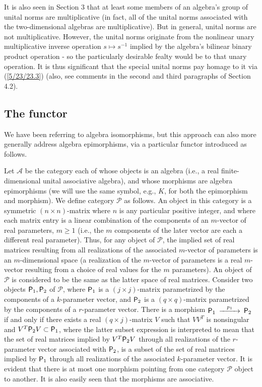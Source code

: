 \documentclass{amsart}
\numberwithin{equation}{section}
\theoremstyle{definition}
\numberwithin{theorem}{section}
\begin{document}
It is also seen in Section 3 that at least some members of an algebra's group of unital norms are multiplicative (in fact, all of the unital norms associated with the two-dimensional algebras are multiplicative).   But in general, unital norms are not multiplicative.  However, the unital norms originate from the nonlinear unary multiplicative inverse operation $s\mapsto s^{-1}$ implied by the algebra's bilinear binary product operation - so the particularly desirable fealty would be to that unary operation.  It is thus significant that the special unital norms pay homage to it via (\ref{5/23/23.3}) (also, see comments in the second and third paragraphs of Section 4.2). 

\subsection{The functor}

We have been referring to algebra isomorphisms, but this approach can also more generally address algebra epimorphisms, via a particular functor introduced as follows.  

Let $\mathcal{A}$ be the category each of whose objects is an algebra (i.e., a real finite-dimensional unital associative algebra), and whose morphisms are algebra epimorphisms (we will use the same symbol, e.g., $K$, for both the epimorphism and morphism).  We define category $\mathcal{P}$ as follows. An object in this category is a symmetric $(n\times n)$-matrix where $n$ is any particular positive integer, and where each matrix entry is a linear combination of the components of an $m$-vector of real parameters, $m\ge 1$ (i.e., the $m$ components of the later vector are each a different real parameter).  Thus, for any object of $\mathcal{P}$, the implied set of real matrices resulting from all realizations of the associated $m$-vector of parameters is an $m$-dimensional space (a realization of the $m$-vector of parameters is a real $m$-vector resulting from a choice of real values for the $m$ parameters).  An object of $\mathcal{P}$ is considered to be the same as the latter space of real matrices.  Consider two objects ${\sf P}_1,{\sf P}_2$ of $\mathcal{P}$, where ${\sf P}_1$ is a $(j\times j)$-matrix parametrized by the components of a $k$-parameter vector, and ${\sf P}_2$ is a $(q\times q)$-matrix parametrized by the components of a $r$-parameter vector.  There is a morphism $ \begin{CD}  {\sf P}_1 @>p_1>> {\sf P}_2\end{CD}$ if and only if  there exists a real $(q\times j)$-matrix $V$ such that $VV^T$ is nonsingular and $V^T{\sf P}_2V\subset {\sf P}_1$, where the latter subset expression 
is interpreted to mean that the set of real matrices implied by $V^T{\sf P}_2V$ through all realizations of the $r$-parameter vector associated with ${\sf P}_2$, is a subset of  the set of real matrices implied by  ${\sf P}_1$ through all realizations of the associated $k$-parameter vector. It is evident that there is at most one morphism pointing from one category $\mathcal{P}$ object to another.  It is also easily seen that the morphisms are associative.  
\end{document}
